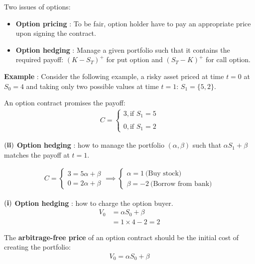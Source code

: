 \begin{definition}
    Two issues of options:
    \begin{itemize}
        \item \textbf{Option pricing} : To be fair, option holder have to pay an appropriate price upon signing the contract.
        \item \textbf{Option hedging} : Manage a given portfolio such that it contains the required payoff: $(K-S_T)^+$ for put option and $(S_T-K)^+$ for call option.
    \end{itemize}
\end{definition}

\textbf{Example} : Consider the following example, a risky asset priced at time $t=0$ at $S_0=4$ and taking only two possible values at time $t=1$: $S_1= \{5, 2\}$.

\noindent \newline An option contract promises the payoff:
\begin{align*}
    C = \begin{cases}
        3, \text{if } S_1 = 5
        \\ \\
        0, \text{if } S_1 = 2
    \end{cases}
\end{align*}

\noindent $\bf (ii)$ \textbf{Option hedging} : how to manage the portfolio $(\alpha, \beta)$ such that $\alpha S_1 + \beta$ matches the payoff at $t=1$.

\begin{align*}
    C = \begin{cases}
        3 = 5\alpha + \beta \\ 
        0 = 2\alpha + \beta
    \end{cases} \implies 
    \begin{cases}
        \alpha = 1 \ \text{(Buy stock)} \\ 
        \beta = -2 \ \text{(Borrow from bank)}
    \end{cases}
\end{align*}

\noindent $\bf (i)$ \textbf{Option hedging} : how to charge the option buyer.
\begin{align*}
    V_0 &= \alpha S_0 + \beta \\
        &= 1 \times 4 - 2 = 2 
\end{align*}

\begin{definition}
    The \textbf{arbitrage-free price} of an option contract should be the initial cost of creating the portfolio:
    \begin{align*}
        V_0 = \alpha S_0 + \beta
    \end{align*}
\end{definition}

